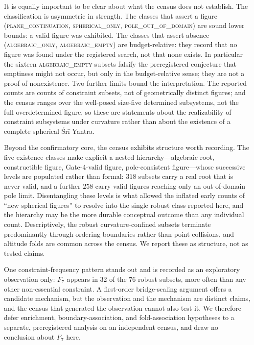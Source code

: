 \documentclass[pdflatex,sn-mathphys-num]{sn-jnl}
\theoremstyle{thmstyleone}%
\theoremstyle{thmstyletwo}%
\theoremstyle{thmstylethree}%
\begin{document}
It is equally important to be clear about what the census does not establish. The classification is asymmetric in strength. The classes that assert a figure (\textsc{plane\_continuation}, \textsc{spherical\_only},
\textsc{pole\_out\_of\_domain}) are sound lower bounds: a valid figure was exhibited. The classes that assert absence (\textsc{algebraic\_only}, \textsc{algebraic\_empty}) are budget-relative: they record that no figure was found under the registered search, not that none exists. In particular the sixteen \textsc{algebraic\_empty} subsets falsify the preregistered conjecture that emptiness might not occur, but only in the budget-relative sense; they are not a proof of nonexistence. Two further limits bound the interpretation. The reported counts are counts of constraint subsets, not of geometrically distinct figures; and the census ranges over the well-posed size-five determined subsystems, not the full overdetermined figure, so these are statements about the realizability of constraint subsystems under curvature rather than about the existence of a complete spherical Śrī Yantra.

Beyond the confirmatory core, the census exhibits structure worth recording. The five existence classes make explicit a nested hierarchy---algebraic root, constructible figure, Gate-4-valid figure, pole-consistent figure---whose successive levels are populated rather than formal: $318$ subsets carry a real root that is never valid, and a further $258$ carry valid figures reaching only an out-of-domain pole limit. Disentangling these levels is what allowed the inflated early counts of ``new spherical figures'' to resolve into the single robust class reported here, and the hierarchy may be the more durable conceptual outcome than any individual count. Descriptively, the robust curvature-confined subsets terminate predominantly through ordering boundaries rather than point collisions, and altitude folds are common across the census. We report these as structure, not as tested claims.

One constraint-frequency pattern stands out and is recorded as an exploratory
observation only: $F_7$ appears in $32$ of the $76$ robust subsets, more often than any other non-essential constraint. A first-order bridge-scaling argument offers a candidate mechanism, but the observation and the mechanism are distinct claims, and the census that generated the observation cannot also test it. We therefore defer enrichment, boundary-association, and fold-association hypotheses to a separate, preregistered analysis on an independent census, and draw no conclusion about $F_7$ here.
\end{document}
